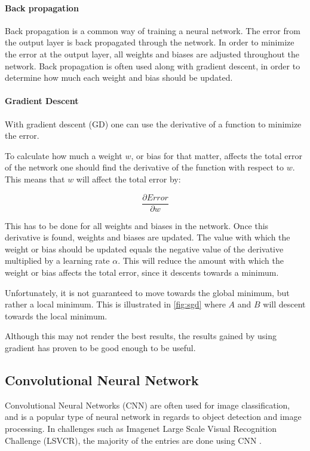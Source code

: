 \paragraph{Back propagation}
Back propagation is a common way of training a neural network.
The error from the output layer is back propagated through the network.
In order to minimize the error at the output layer, all weights and biases are adjusted throughout the network.
Back propagation is often used along with gradient descent, in order to determine how much each weight and bias should be updated.

\paragraph{Gradient Descent}
With gradient descent (GD) one can use the derivative of a function to minimize the error.

To calculate how much a weight $w$, or bias for that matter, affects the total error of the network one should find the derivative of the function with respect to $w$.
This means that $w$ will affect the total error by:

$$\frac{\partial Error}{\partial w}$$

This has to be done for all weights and biases in the network.
Once this derivative is found, weights and biases are updated.
The value with which the weight or bias should be updated equals the negative value of the derivative multiplied by a learning rate $\alpha$.
This will reduce the amount with which the weight or bias affects the total error, since it descents towards a minimum.

Unfortunately, it is not guaranteed to move towards the global minimum, but rather a local minimum.
This is illustrated in \autoref{fig:sgd} where $A$ and $B$ will descent towards the local minimum.


Although this may not render the best results, the results gained by using gradient has proven to be good enough to be useful.

\subsection{Convolutional Neural Network}
\label{sec:cnn}
Convolutional Neural Networks (CNN) are often used for image classification, and is a popular type of neural network in regards to object detection and image processing.
In challenges such as Imagenet Large Scale Visual Recognition Challenge (LSVCR), the majority of the entries are done using CNN \cite{ILSVRC_Results}. 

